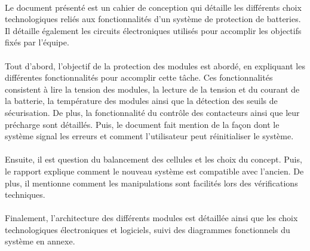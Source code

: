 		\paragraph*{}			
		Le document présenté est un cahier de conception qui détaille les différents choix technologiques reliés aux fonctionnalités d'un système de protection de batteries. Il détaille également les circuits électroniques utilisés pour accomplir les objectifs fixés par l'équipe. 

		\paragraph*{}		
		Tout d'abord, l'objectif de la protection des modules est abordé, en expliquant les différentes fonctionnalités pour accomplir cette tâche. Ces fonctionnalités consistent à lire la tension des modules, la lecture de la tension et du courant de la batterie, la température des modules ainsi que la détection des seuils de sécurisation. De plus, la fonctionnalité du contrôle des contacteurs ainsi que leur précharge sont détaillés. Puis, le document fait mention de la façon dont le système signal les erreurs et comment l'utilisateur peut réinitialiser le système.
		
		\paragraph*{}
		Ensuite, il est question du balancement des cellules et les choix du concept. Puis, le rapport explique comment le nouveau système est compatible avec l'ancien. De plus, il mentionne comment les manipulations sont facilités lors des vérifications techniques.
		
		\paragraph*{}
		Finalement, l'architecture des différents modules est détaillée ainsi que les choix technologiques électroniques et logiciels, suivi des diagrammes fonctionnels du système en annexe.
	
			

